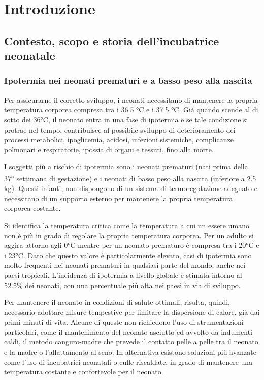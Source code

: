 \chapter{Introduzione}
\section{Contesto, scopo e storia dell'incubatrice neonatale}
\subsection{Ipotermia nei neonati prematuri e a basso peso alla nascita}
Per assicurarne il corretto sviluppo, i neonati necessitano di mantenere la propria temperatura corporea compresa
tra i 36.5 °C e i 37.5 °C. Già quando scende al di sotto dei 36°C, il neonato entra in una fase di ipotermia e se
tale condizione si protrae nel tempo, contribuisce al possibile sviluppo di deterioramento dei processi metabolici,
ipoglicemia, acidosi, infezioni sistemiche, complicanze polmonari e respiratorie, ipossia di organi e tessuti, fino
alla morte. \cite{lunze2013}

I soggetti più a rischio di ipotermia sono i neonati prematuri (nati prima della 37\textsuperscript{a} settimana di
gestazione) e i neonati di basso peso alla nascita (inferiore a 2.5 kg). Questi infanti, non dispongono di un sistema
di termoregolazione adeguato e necessitano di un supporto esterno per mantenere la propria temperatura corporea costante.
\cite{ruan2024}

Si identifica la temperatura critica come la temperatura a cui un essere umano non è più in grado di regolare la propria
temperatura corporea. Per un adulto si aggira attorno agli 0°C mentre per un neonato prematuro è compresa tra i 20°C e
i 23°C. \cite{who1993} Dato che questo valore è particolarmente elevato, casi di ipotermia sono molto frequenti nei neonati prematuri
in qualsiasi parte del mondo, anche nei paesi tropicali. L'incidenza di ipotermia a livello globale è stimata intorno
al 52.5\% dei neonati, con una percentuale più alta nei paesi in via di sviluppo. \cite{ruan2024}

Per mantenere il neonato in condizioni di salute ottimali, risulta, quindi, necessario adottare misure tempestive per
limitare la dispersione di calore, già dai primi minuti di vita. Alcune di queste non richiedono l'uso di strumentazioni
particolari, come il mantenimento del neonato asciutto ed avvolto da indumenti caldi, il metodo canguro-madre che prevede
il contatto pelle a pelle tra il neonato e la madre o l'allattamento al seno. In alternativa esistono soluzioni più avanzate
come l'uso di incubatrici neonatali o culle riscaldate, in grado di mantenere una temperatura costante e confortevole
per il neonato. \cite{who1993}


